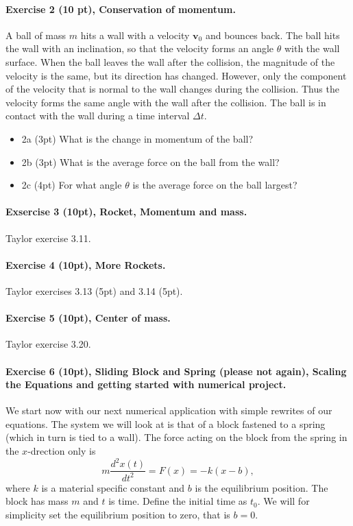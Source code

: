 \documentclass[%
oneside,                 %
final,                   %
10pt]{article}
\begin{document}
\noindent
\paragraph{Exercise 2 (10 pt), Conservation of  momentum.}
A ball of mass $m$ hits a wall with a velocity $\bm{v}_0$ and bounces
back. The ball hits the wall with an inclination, so that the velocity
forms an angle $\theta$ with the wall surface. When the ball leaves
the wall after the collision, the magnitude of the velocity is the
same, but its direction has changed. However, only the component of
the velocity that is normal to the wall changes during the collision.
Thus the velocity forms the same angle with the wall after the
collision. The ball is in contact with the wall during a time interval
$\Delta t$.

\begin{itemize}
\item 2a (3pt) What is the change in momentum of the ball?

\item 2b (3pt) What is the average force on the ball from the wall?

\item 2c (4pt) For what angle $\theta$ is the average force on the ball largest? 
\end{itemize}

\noindent
\paragraph{Exsercise 3 (10pt), Rocket, Momentum and mass.}
Taylor exercise 3.11.

\paragraph{Exercise 4 (10pt), More Rockets.}
Taylor exercises 3.13 (5pt) and 3.14 (5pt).

\paragraph{Exercise 5 (10pt), Center of mass.}
Taylor exercise 3.20.


\paragraph{Exercise 6 (10pt), Sliding Block  and Spring (please not again), Scaling the Equations and getting started with numerical project.}
We start now with our next numerical application with simple rewrites of our equations. The system we will look at is that of a block fastened to a spring (which in turn is tied to a wall).
The force acting on the block from the spring in the $x$-drection only is
\[
m\frac{d^2x(t)}{dt^2}=F(x) = -k(x-b),
\]
where $k$ is a material specific constant and $b$ is the equilibrium position. The block has mass $m$ and $t$ is time. Define the initial time as $t_0$. We will for simplicity set the equilibrium position to zero, that is $b=0$.
\end{document}
